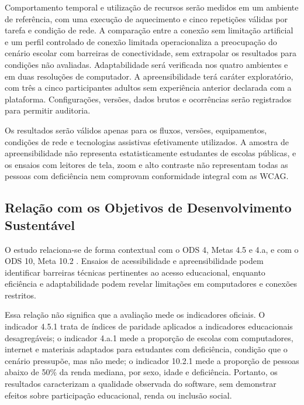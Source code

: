 Comportamento temporal e utilização de recursos serão medidos em um
ambiente de referência, com uma execução de aquecimento e cinco
repetições válidas por tarefa e condição de rede. A comparação entre a
conexão sem limitação artificial e um perfil controlado de conexão
limitada operacionaliza a preocupação do cenário escolar com barreiras
de conectividade, sem extrapolar os resultados para condições não
avaliadas. Adaptabilidade será verificada nos quatro ambientes e em duas
resoluções de computador.
A apreensibilidade terá caráter exploratório, com três a cinco
participantes adultos sem experiência anterior declarada com a
plataforma. Configurações, versões, dados brutos e ocorrências serão
registrados para permitir auditoria.

Os resultados serão válidos apenas para os fluxos, versões,
equipamentos, condições de rede e tecnologias assistivas
efetivamente utilizados. A amostra de apreensibilidade não representa
estatisticamente estudantes de escolas públicas, e os ensaios com
leitores de tela, zoom e alto contraste não representam todas as pessoas
com deficiência nem comprovam conformidade integral com as WCAG.

\subsection{Relação com os Objetivos de Desenvolvimento Sustentável}

O estudo relaciona-se de forma contextual com o ODS 4, Metas 4.5 e
4.a, e com o ODS 10, Meta 10.2 \cite{un_sdg4_5,un_sdg4_a,un_sdg10_2}. Ensaios de
acessibilidade e apreensibilidade podem identificar barreiras
técnicas pertinentes ao acesso educacional, enquanto eficiência e
adaptabilidade podem revelar limitações em computadores e conexões
restritos.

Essa relação não significa que a avaliação mede os indicadores
oficiais. O indicador 4.5.1 trata de índices de paridade aplicados a
indicadores educacionais desagregáveis; o indicador 4.a.1 mede a
proporção de escolas com computadores, internet e materiais adaptados
para estudantes com deficiência, condição que o cenário pressupõe, mas
não mede; o indicador 10.2.1 mede a
proporção de pessoas abaixo de 50\% da renda mediana, por sexo, idade
e deficiência. Portanto, os resultados caracterizam a qualidade
observada do software, sem demonstrar efeitos sobre participação
educacional, renda ou inclusão social.
